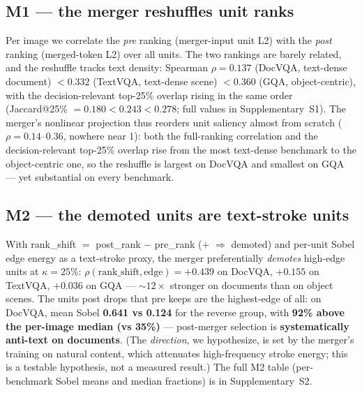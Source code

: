 \documentclass[journal]{IEEEtran}
\begin{document}
\subsection{M1 --- the merger reshuffles unit ranks}\label{sec:m1}

Per image we correlate the \emph{pre} ranking (merger-input unit L2) with the
\emph{post} ranking (merged-token L2) over all units. The two rankings are
barely related, and the reshuffle tracks text density: Spearman
$\rho = \mathbf{0.137}$ (DocVQA, text-dense document) $< 0.332$ (TextVQA,
text-dense scene) $< \mathbf{0.360}$ (GQA, object-centric), with the
decision-relevant top-25\% overlap rising in the same order (Jaccard@25\%
$= 0.180 < 0.243 < 0.278$; full values in Supplementary~S1). The merger's
nonlinear projection thus reorders unit saliency almost from scratch
($\rho = 0.14$--$0.36$, nowhere near 1): both the full-ranking correlation and
the decision-relevant top-25\% overlap rise from the most text-dense benchmark
to the object-centric one, so the reshuffle is largest on DocVQA and smallest on
GQA --- yet substantial on every benchmark.

\subsection{M2 --- the demoted units are text-stroke units}\label{sec:m2}

With rank\_shift $=$ post\_rank $-$ pre\_rank ($+$ $\Rightarrow$ demoted) and
per-unit Sobel edge energy as a text-stroke proxy, the merger preferentially
\emph{demotes} high-edge units at $\kappa = 25\%$: $\rho(\text{rank\_shift},
\text{edge}) = +0.439$ on DocVQA, $+0.155$ on TextVQA, $+0.036$ on GQA ---
${\sim}12\times$ stronger on documents than on object scenes. The units post
drops that pre keeps are the highest-edge of all: on DocVQA, mean Sobel
\textbf{0.641 vs 0.124} for the reverse group, with \textbf{92\% above the
per-image median (vs 35\%)} --- post-merger selection is \textbf{systematically
anti-text on documents}. (The \emph{direction}, we hypothesize, is set by the
merger's training on natural content, which attenuates high-frequency stroke
energy; this is a testable hypothesis, not a measured result.) The full M2 table
(per-benchmark Sobel means and median fractions) is in Supplementary~S2.
\end{document}
